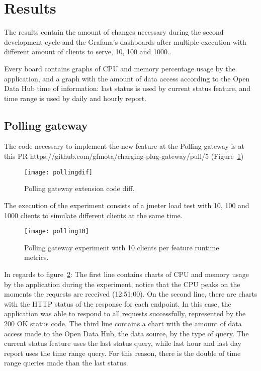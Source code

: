 \section{Results}
\label{sec:results}

The results contain the amount of changes necessary during the second development cycle and the Grafana's dashboards after multiple execution with different amount of clients to serve, 10, 100 and 1000..

Every board contains graphs of CPU and memory percentage usage by the application, and a graph with the amount of data access according to the Open Data Hub time of information: last status is used by current status feature, and time range is used by daily and hourly report.

\subsection*{Polling gateway}
\label{sec:pollingresult}

The code necessary to implement the new feature at the Polling gateway is at this PR https://github.com/gfmota/charging-plug-gateway/pull/5 (Figure~\ref{fig:pollingdif})

\begin{figure}
    \centering
    \texttt{[image: pollingdif]}
    \caption{Polling gateway extension code diff.\label{fig:pollingdif}}
\end{figure}

The execution of the experiment consists of a jmeter load test with 10, 100 and 1000 clients to simulate different clients at the same time.

\begin{figure}
    \centering
    \texttt{[image: polling10]}
    \caption{Polling gateway experiment with 10 clients per feature runtime metrics.\label{fig:polling10}}
\end{figure}

In regards to figure~\ref{fig:polling10}: The first line contains charts of CPU and memory usage by the application during the experiment, notice that the CPU peaks on the moments the requests are received (12:51:00). On the second line, there are charts with the HTTP status of the response for each endpoint. In this case, the application was able to respond to all requests successfully, represented by the 200 OK status code. The third line contains a chart with the amount of data access made to the Open Data Hub, the data source, by the type of query. The current status feature uses the last status query, while last hour and last day report uses the time range query. For this reason, there is the double of time range queries made than the last status. 

